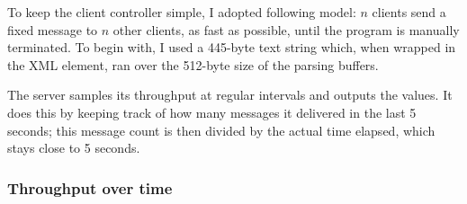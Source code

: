 To keep the client controller simple, I adopted following model: $n$ clients send a fixed message to $n$ other clients, as fast as possible, until the program is manually terminated. To begin with, I used a 445-byte text string which, when wrapped in the XML  element, ran over the 512-byte size of the parsing buffers.

The server samples its throughput at regular intervals and outputs the values. It does this by keeping track of how many messages it delivered in the last 5 seconds; this message count is then divided by the actual time elapsed, which stays close to 5 seconds.

\subsubsection{Throughput over time}
